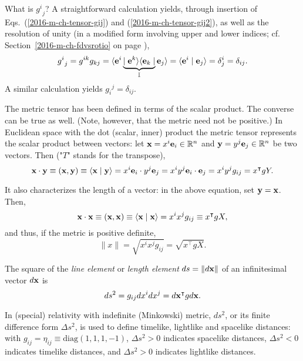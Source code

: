 What is  ${g^i}_{j}$?
A straightforward calculation yields, through insertion of Eqs.~(\ref{2016-m-ch-tensor-gij}) and (\ref{2016-m-ch-tensor-gij2}),
as well as the resolution of unity (in a modified form involving upper and lower indices;
cf. Section~\ref{2016-m-ch-fdvsrotio} on page \pageref{2016-m-ch-fdvsrotio}),
\begin{equation}
{g^i}_{j} = g^{ik}g_{kj}  =
\langle {\bf e}^i \underbrace{\mid {\bf e}^k \rangle \langle {\bf e}_k \mid}_{{\Bbb I}} {\bf e}_j\rangle
= \langle {\bf e}^i \mid {\bf e}_j\rangle
= \delta^i_j = \delta_{ij}.
\label{2014-m-ch-tensor-deltag}
\end{equation}
A similar calculation yields ${g_i}^{j} = \delta_{ij}$.




The metric tensor has been defined in terms of the scalar product.
The converse can be true as well.
(Note, however, that the metric need not be positive.)
In Euclidean space with the dot (scalar, inner) product
the metric tensor represents the scalar product between vectors: let
${\bf x}=x^i{\bf e}_i \in {\Bbb R}^n$ and ${\bf y}=y^j{\bf e}_j \in {\Bbb R}^n$ be two vectors.
Then ("$T$" stands for the transpose),
\begin{equation}
{\bf x}\cdot {\bf y}\equiv ({\bf x},{\bf y})\equiv \langle {\bf x}\mid {\bf y}\rangle
= x^i {\bf e}_i\cdot y^j {\bf e}_j
= x^iy^j {\bf e}_i\cdot  {\bf e}_j
=x^iy^j g_{ij}= x^\intercal  g Y.
\end{equation}

It also characterizes the length of a vector: in the above
equation, set ${\bf y}={\bf x}$. Then,
\begin{equation}
{\bf x}\cdot {\bf x}\equiv ({\bf x},{\bf x})\equiv \langle {\bf x}\mid {\bf x}\rangle
=x^ix^j g_{ij}\equiv x^\intercal  g X,
\end{equation}
and thus, if the metric is positive definite,
\begin{equation}
\|  x\|  =\sqrt{x^ix^j g_{ij}}= \sqrt{x^\intercal  g X}.
\end{equation}



The square of the {\em line element} or {\em length element}
$ds =\| d{\bf x} \| $ of an infinitesimal vector $d{\bf x} $ is
\begin{equation}
d s^2  = g_{ij}dx^i dx^j= d{\bf x}^\intercal  g d{\bf x}.
\end{equation}

In (special) relativity with indefinite (Minkowski) metric, $ds^2$, or its finite difference form $\Delta s^2$, is used to define timelike, lightlike and spacelike distances:
with $g_{ij}=\eta_{ij}\equiv \text{diag}(1,1,1,-1)$,
$\Delta s^2 >0$ indicates spacelike distances,
$\Delta s^2 <0$ indicates timelike distances,
and $\Delta s^2 >0$ indicates lightlike distances.




